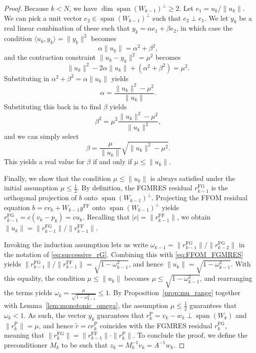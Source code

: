 \documentclass{siamart251216}
\DeclareMathOperator{\spn}{span}
\begin{document}
{\begin{proof}
    Because $k < N$, we have $\dim \spn(W_{k-1})^\perp \geq 2$. Let $e_1 = u_k / \|u_k\|$. We can pick a unit vector $e_2 \in \spn(W_{k-1})^\perp$ such that $e_2 \perp e_1$. We let $y_k$ be a real linear combination of these such that $y_k = \alpha e_1 + \beta e_2$, in which case the condition $\langle u_k, y_k \rangle = \|y_k\|^2$ becomes $$ \alpha \|u_k\| = \alpha^2 + \beta^2, $$ and the contraction constraint $\|u_k - y_k\|^2 = \mu^2$ becomes
    $$\|u_k\|^2 - 2\alpha\|u_k\| + (\alpha^2 + \beta^2) = \mu^2.$$
    Substituting in $\alpha^2 + \beta^2 = \alpha \|u_k\|$ yields
    $$ \alpha = \frac{\|u_k\|^2 - \mu^2}{\|u_k\|}. $$
    Substituting this back in to find $\beta$ yields
    $$ \beta^2 = \mu^2 \frac{\|u_k\|^2 - \mu^2}{\|u_k\|^2}, $$
    and we can simply select
    $$ \beta = \frac{\mu}{\|u_k\|} \sqrt{\|u_k\|^2 - \mu^2}. $$
    This yields a real value for $\beta$ if and only if $\mu \leq \|u_k\|$.

    Finally, we show that the condition $\mu \leq \|u_k\|$ is always satisfied under the initial assumption $\mu \leq \frac{1}{2}$. By definition, the FGMRES residual $r_{k-1}^{\mathrm{FG}}$ is the orthogonal projection of $b$ onto $\spn(W_{k-1})^\perp$. Projecting the FFOM residual equation $b = c v_k + W_{k-1} y^{\mathrm{FF}}$ onto $\spn(W_{k-1})^\perp$ yields $r_{k-1}^{\mathrm{FG}} = c(v_k - p_k) = c u_k$. Recalling that $|c| = \|r_{k-1}^{\mathrm{FF}}\|$, we obtain $\|u_k\| = \|r_{k-1}^{\mathrm{FG}}\| / \|r_{k-1}^{\mathrm{FF}}\|$.

    Invoking the induction assumption lets us write $\omega_{k-1} = \|r_{k-1}^{\mathrm{FG}}\| / \|r_{k-2}^{\mathrm{FG}}\|$ in the notation of \eqref{eq:successive_rG}. Combining this with \eqref{eq:FFOM_FGMRES} yields $\|r_{k-1}^{\mathrm{FG}}\| / \|r_{k-1}^{\mathrm{FF}}\| = \sqrt{1 - \omega_{k-1}^2}$, and hence $\|u_k\| = \sqrt{1 - \omega_{k-1}^2}$.
    With this equality, the condition $\mu \leq \|u_k\|$ becomes $\mu \leq \sqrt{1 - \omega_{k-1}^2}$, and rearranging the terms yields $\omega_k = \frac{\mu}{\sqrt{1 - \omega_{k-1}^2}} \leq 1.$ By Proposition~\ref{prop:mu_range} together with Lemma~\ref{lem:monotonic_omega}, the assumption $\mu \leq \frac{1}{2}$ guarantees that $\omega_k < 1$. As such, the vector $y_k$ guarantees that $r_k^{\mathrm{P}} = v_k - w_k \perp \spn(W_k)$ and $\|r_k^{\mathrm{P}}\| = \mu$, and hence $\tilde r = c r_k^{\mathrm{P}}$ coincides with the FGMRES residual $r_k^{\mathrm{FG}}$, meaning that $\|r_k^{\mathrm{FG}}\| = \|r_{k-1}^{\mathrm{FF}}\|\cdot \|r_k^{\mathrm{P}}\|.$ To conclude the proof, we define the preconditioner $M_k$ to be such that $z_k = M_k^{-1} v_k = A^{-1} w_k$.
\end{proof}

}
\end{document}
